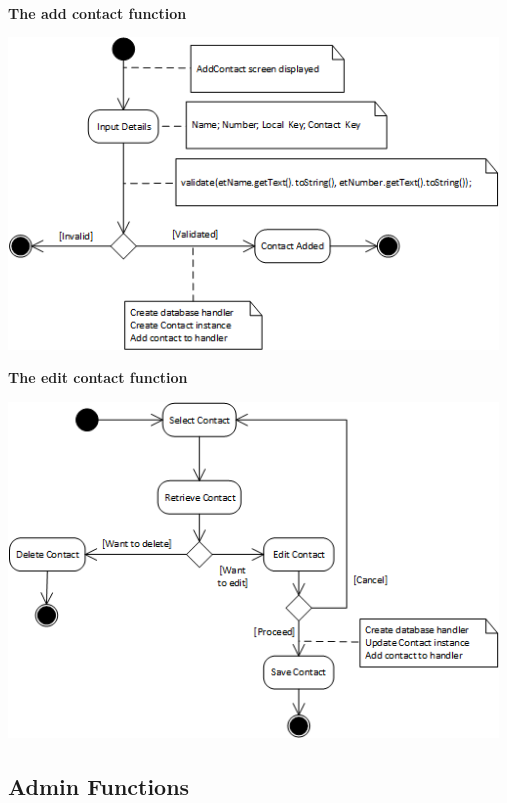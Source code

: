 \textbf{\\}
\begin{center}
\textbf{The add contact function\\}
\end{center}
 \includegraphics[width=13cm]{diagrams/StateDiagrams/AddContactStateDiagram.png}
\textbf{\\}
\begin{center}
\textbf{The edit contact function\\}
\end{center}
 \includegraphics[width=13cm]{diagrams/StateDiagrams/EditContactStateDiagram.png}

\normalsize
\vspace{12pt}

\subsection{Admin Functions}

